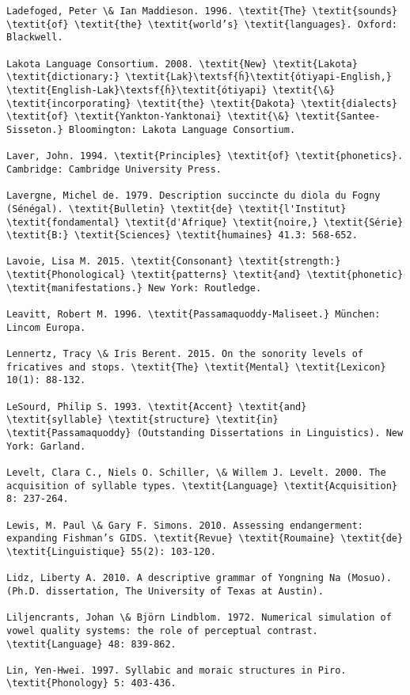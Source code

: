 \begin{verbatim}
Ladefoged, Peter \& Ian Maddieson. 1996. \textit{The} \textit{sounds} \textit{of} \textit{the} \textit{world’s} \textit{languages}. Oxford: Blackwell.

Lakota Language Consortium. 2008. \textit{New} \textit{Lakota} \textit{dictionary:} \textit{Lak}\textsf{ȟ}\textit{ótiyapi-English,} \textit{English-Lak}\textsf{ȟ}\textit{ótiyapi} \textit{\&} \textit{incorporating} \textit{the} \textit{Dakota} \textit{dialects} \textit{of} \textit{Yankton-Yanktonai} \textit{\&} \textit{Santee-Sisseton.} Bloomington: Lakota Language Consortium.

Laver, John. 1994. \textit{Principles} \textit{of} \textit{phonetics}. Cambridge: Cambridge University Press.

Lavergne, Michel de. 1979. Description succincte du diola du Fogny (Sénégal). \textit{Bulletin} \textit{de} \textit{l'Institut} \textit{fondamental} \textit{d'Afrique} \textit{noire,} \textit{Série} \textit{B:} \textit{Sciences} \textit{humaines} 41.3: 568-652.

Lavoie, Lisa M. 2015. \textit{Consonant} \textit{strength:} \textit{Phonological} \textit{patterns} \textit{and} \textit{phonetic} \textit{manifestations.} New York: Routledge.

Leavitt, Robert M. 1996. \textit{Passamaquoddy-Maliseet.} München: Lincom Europa.

Lennertz, Tracy \& Iris Berent. 2015. On the sonority levels of fricatives and stops. \textit{The} \textit{Mental} \textit{Lexicon} 10(1): 88-132.

LeSourd, Philip S. 1993. \textit{Accent} \textit{and} \textit{syllable} \textit{structure} \textit{in} \textit{Passamaquoddy} (Outstanding Dissertations in Linguistics). New York: Garland.

Levelt, Clara C., Niels O. Schiller, \& Willem J. Levelt. 2000. The acquisition of syllable types. \textit{Language} \textit{Acquisition} 8: 237-264.

Lewis, M. Paul \& Gary F. Simons. 2010. Assessing endangerment: expanding Fishman’s GIDS. \textit{Revue} \textit{Roumaine} \textit{de} \textit{Linguistique} 55(2): 103-120.

Lidz, Liberty A. 2010. A descriptive grammar of Yongning Na (Mosuo). (Ph.D. dissertation, The University of Texas at Austin).

Liljencrants, Johan \& Björn Lindblom. 1972. Numerical simulation of vowel quality systems: the role of perceptual contrast. \textit{Language} 48: 839-862.

Lin, Yen-Hwei. 1997. Syllabic and moraic structures in Piro. \textit{Phonology} 5: 403-436.


\end{verbatim}
